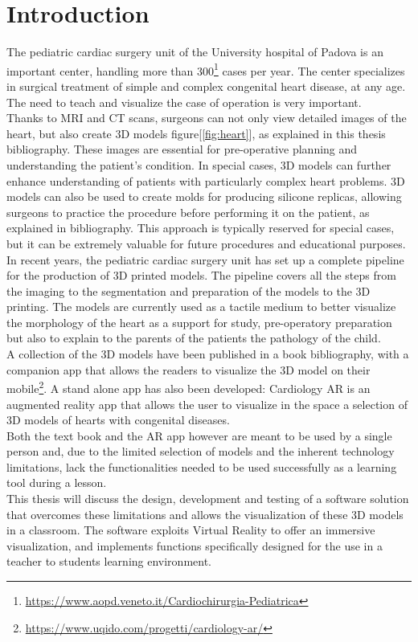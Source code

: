 
\chapter{Introduction}
\label{chp:intro}
\noindent
The pediatric cardiac surgery unit of the University hospital of Padova is an important center, handling more than 300\footnote{\url{https://www.aopd.veneto.it/Cardiochirurgia-Pediatrica}} cases per year. The center specializes in surgical treatment of simple and complex congenital heart disease, at any age.
The need to teach and visualize the case of operation is very important. \\
Thanks to \ac{MRI} and \ac{CT} scans, surgeons can not only view detailed images of the heart, but also create 3D models figure[\ref{fig:heart}], as explained in this thesis bibliography\cite{thesisFrancesco}. These images are essential for pre-operative planning and understanding the patient's condition.
In special cases, 3D models can further enhance understanding of patients with particularly complex heart problems.
3D models can also be used to create molds for producing silicone replicas, allowing surgeons to practice the procedure before performing it on the patient, as explained in bibliography\cite{thesisFabio}.
This approach is typically reserved for special cases, but it can be extremely valuable for future procedures and educational purposes.\\
In recent years, the pediatric cardiac surgery unit has set up a complete pipeline for the production of 3D printed models.
The pipeline covers all the steps from the imaging to the segmentation and preparation of the models to the 3D printing.
The models are currently used as a tactile medium to better visualize the morphology of the heart as a support for study, pre-operatory preparation but also to explain to the parents of the patients the pathology of the child.\\
A collection of the 3D models have been published in a book bibliography\cite{book}, with a companion app that allows the readers to visualize the 3D model on their mobile\footnote{\url{https://www.uqido.com/progetti/cardiology-ar/}}.
A stand alone app has also been developed: Cardiology AR is an augmented reality app that allows the user to visualize in the space a selection of 3D models of hearts with congenital diseases.\\
Both the text book and the AR app however are meant to be used by a single person and, due to the limited selection of models and the inherent technology limitations, lack the functionalities needed to be used successfully as a learning tool during a lesson.\\
This thesis will discuss the design, development and testing of a software solution that overcomes these limitations and allows the visualization of these 3D models in a classroom.
The software exploits Virtual Reality to offer an immersive visualization, and implements functions specifically designed for the use in a teacher to students learning environment.

